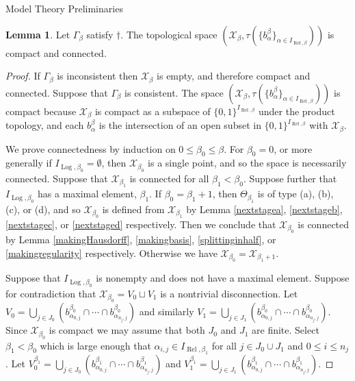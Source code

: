 \documentclass{amsart}
\theoremstyle{definition}\newtheorem{theorem}{Theorem}
\theoremstyle{definition}\newtheorem{bigtheorem}{Theorem}
\numberwithin{theorem}{section}
\theoremstyle{definition}\newtheorem{corollary}[theorem]{Corollary}
\theoremstyle{definition}\newtheorem{proposition}[theorem]{Proposition}
\theoremstyle{definition}\newtheorem{definition}[theorem]{Definition}
\theoremstyle{definition}\newtheorem{question}[theorem]{Question}
\theoremstyle{definition}\newtheorem{example}[theorem]{Example}
\theoremstyle{definition}\newtheorem{remark}[theorem]{Remark}
\theoremstyle{definition}\newtheorem{note}[theorem]{Note}
\theoremstyle{definition}\newtheorem{lemma}[theorem]{Lemma}
\theoremstyle{definition}\newtheorem{fact}[theorem]{Fact}
\theoremstyle{definition}\newtheorem{define}[theorem]{Definition}
\theoremstyle{definition}\newtheorem{definitions}[theorem]{Definitions}
\theoremstyle{definition}\newtheorem{claim}[theorem]{Claim}
\theoremstyle{definition}\newtheorem{obs}[theorem]{Observation}
\theoremstyle{definition}\newtheorem{construction}[theorem]{Construction}
\newcommand{\Rel}{\operatorname{Rel}}
\newcommand{\Log}{\operatorname{Log}}
\newcommand{\X}{\mathcal{X}}
\begin{document}
\begin{section}{Model Theory Preliminaries}
\begin{lemma}\label{compactconnected}  Let $\Gamma_{\beta}$ satisfy $\dagger$.  The topological space $(\X_{\beta}, \tau(\{b_{\alpha}^{\beta}\}_{\alpha \in I_{\Rel, \beta}}))$ is compact and connected.
\end{lemma}

\begin{proof}  If $\Gamma_{\beta}$ is inconsistent then $\X_{\beta}$ is empty, and therefore compact and connected.  Suppose that $\Gamma_{\beta}$ is consistent.  The space $(\X_{\beta}, \tau(\{b_{\alpha}^{\beta}\}_{\alpha \in I_{\Rel, \beta}}))$ is compact because $\X_{\beta}$ is compact as a subspace of $\{0, 1\}^{I_{\Rel, \beta}}$ under the product topology, and each $b_{\alpha}^{\beta}$ is the intersection of an open subset in $\{0, 1\}^{I_{\Rel, \beta}}$ with $\X_{\beta}$.

We prove connectedness by induction on $0 \leq \beta_0 \leq \beta$.  For $\beta_0 = 0$, or more generally if $I_{\Log, \beta_0} = \emptyset$, then $\X_{\beta_0}$ is a single point, and so the space is necessarily connected.  Suppose that $\X_{\beta_1}$ is connected for all $\beta_1 < \beta_0$.  Suppose further that $I_{\Log, \beta_0}$ has a maximal element, $\beta_1$.  If $\beta_0 = \beta_1 + 1$, then $\Theta_{\beta_1}$ is of type (a), (b), (c), or (d), and so $\X_{\beta_0}$ is defined from $\X_{\beta_1}$ by Lemma \ref{nextstagea}, \ref{nextstageb}, \ref{nextstagec}, or \ref{nextstaged} respectively.  Then we conclude that $\X_{\beta_0}$ is connected by Lemma \ref{makingHausdorff}, \ref{makingbasis}, \ref{splittinginhalf}, or \ref{makingregularity} respectively.  Otherwise we have $\X_{\beta_0} = \X_{\beta_1 + 1}$.

Suppose that $I_{\Log, \beta_0}$ is nonempty and does not have a maximal element.  Suppose for contradiction that $\X_{\beta_0} = V_0 \sqcup V_1$ is a nontrivial disconnection.  Let $V_0 = \bigcup_{j\in J_0}(b_{\alpha_{0, j}}^{\beta_0} \cap \cdots \cap b_{\alpha_{n_j, j}}^{\beta_0})$ and similarly $V_1 = \bigcup_{j\in J_1}(b_{\alpha_{0, j}}^{\beta_0} \cap \cdots \cap b_{\alpha_{n_j, j}}^{\beta_0})$.  Since $\X_{\beta_0}$ is compact we may assume that both $J_0$ and $J_1$ are finite.  Select $\beta_1 < \beta_0$ which is large enough that $\alpha_{i, j} \in I_{\Rel, \beta_1}$ for all $j \in J_0 \cup J_1$ and $0 \leq i \leq n_j$.  Let $V_0^{\beta_1} = \bigcup_{j\in J_0}(b_{\alpha_{0, j}}^{\beta_1} \cap \cdots \cap b_{\alpha_{n_j, j}}^{\beta_1})$ and $V_1^{\beta_1} = \bigcup_{j\in J_1}(b_{\alpha_{0, j}}^{\beta_1} \cap \cdots \cap b_{\alpha_{n_j, j}}^{\beta_1})$.


\end{proof}
\end{section}
\end{document}
